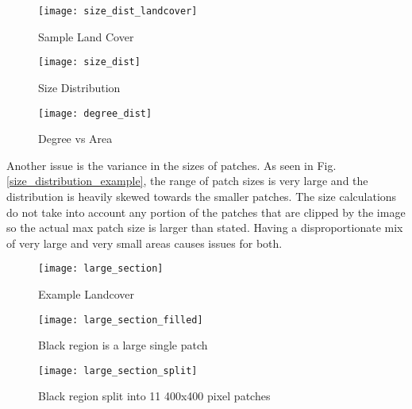 \documentclass[conference]{IEEEtran}
\begin{document}
	\begin{figure*}[t!]
		\centering
		\begin{subfigure}[b]{0.29\textwidth}
			\centering
			\texttt{[image: size\_dist\_landcover]}
			\caption{Sample Land Cover}
			\label{simple_land_cover}
		\end{subfigure}
		\hfill
		\begin{subfigure}[b]{0.32\textwidth}
			\centering
			\texttt{[image: size\_dist]}
			\caption{Size Distribution}
			\label{size_distribution}
		\end{subfigure}
		\begin{subfigure}[b]{0.33\textwidth}
			\centering
			\texttt{[image: degree\_dist]}
			\caption{Degree vs Area}
			\label{degree_vs_area}
		\end{subfigure}
		\caption{This figure shows the distribution of patch sizes as well as the relationship between area and degree of the patches from a random section of landcover. In this example 80\% of the patches have an area of 12 pixels or less while the range of sizes is 1 to 396620 pixels.}
		\label{size_distribution_example}
	\end{figure*}
	
	Another issue is the variance in the sizes of patches. As seen in Fig. \ref{size_distribution_example}, the range of patch sizes is very large and the distribution is heavily skewed towards the smaller patches. The size calculations do not take into account any portion of the patches that are clipped by the image so the actual max patch size is larger than stated. Having a disproportionate mix of very large and very small areas causes issues for both.
	
	\begin{figure*}[t!]
		\centering
		\begin{subfigure}[b]{0.3\textwidth}
			\centering
			\texttt{[image: large\_section]}
			\caption{Example Landcover}
			\label{large_section}
		\end{subfigure}
		\hfill
		\begin{subfigure}[b]{0.3\textwidth}
			\centering
			\texttt{[image: large\_section\_filled]}
			\caption{Black region is a large single patch}
			\label{large_section_filled}
		\end{subfigure}
		\hfill
		\begin{subfigure}[b]{0.3\textwidth}
			\centering
			\texttt{[image: large\_section\_split]}
			\caption{Black region split into 11 400x400 pixel patches}
			\label{large_section_split}
		\end{subfigure}
		
		\caption{This figure shows the dificulty when dealing with large patches. The patch highlighted in black is adjacent to many different patches but when creating regions it is only able to become part of one created region. \ref{large_section_split} shows a possible outcome of spliting the large patch into smaller ones.}
		\label{large_patch_example}
	\end{figure*}
	
\end{document}
